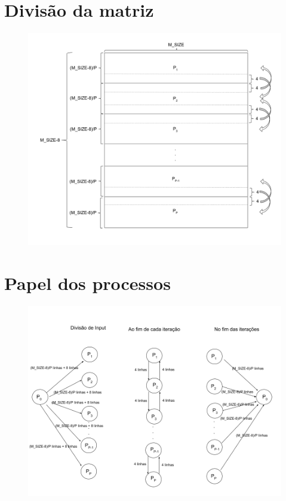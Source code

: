 \documentclass{article}
\begin{document}

\begin{appendices}

\section{Divisão da matriz}
\label{divMatrix}
\begin{figure}[H]
    \centering
    \includegraphics[width=15cm]{Pictures/matrixDraw.png}
\end{figure}


\section{Papel dos processos}
\label{procsMPI}
\begin{figure}[H]
    \centering
    \includegraphics[width=15cm]{Pictures/graphDraw.png}
\end{figure}



\end{appendices}
\end{document}
